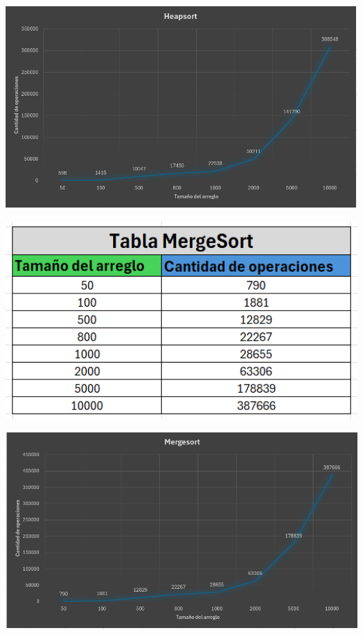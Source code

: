 \documentclass[12pt]{article}
\begin{document}
\par\vspace{0.4cm}
\includegraphics[width=15cm]{Images/Graf_HS.png}
\par\vspace{0.4cm}
\includegraphics[width=15cm]{Images/Tab_MS.png}
\par\vspace{0.4cm}
\includegraphics[width=15cm]{Images/Graf_MS.png}
\end{document}
